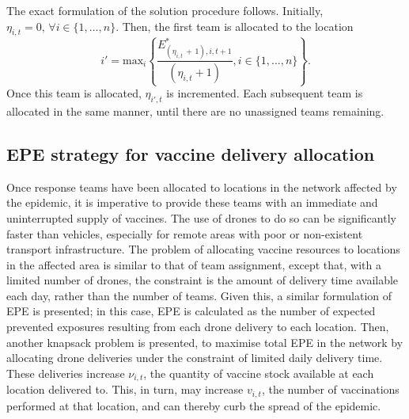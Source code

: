 \documentclass[10pt,letterpaper]{article}
\begin{document}
The exact formulation of the solution procedure follows. Initially, $\eta_{i,t} = 0, \, \forall{i} \in \{1,\dots,n \}$. 
Then, the first team is allocated to the location $$i' = \text{max}_{i} \left\{ \frac{E^{*}_{(\eta_{i,t}\,+\,1),i,t+1}}{(\eta_{i,t} + 1)}, i \in \{1, \dots, n\} \right\}.$$ 
Once this team is allocated, $\eta_{i',t}$ is incremented. Each subsequent team is allocated in the same manner, until there are no unassigned teams remaining. 

\subsection*{EPE strategy for vaccine delivery allocation}

Once response teams have been allocated to locations in the network affected by the epidemic, it is imperative to provide these teams with an immediate and uninterrupted supply of vaccines. The use of drones to do so can be significantly faster than vehicles, especially for remote areas with poor or non-existent transport infrastructure. The problem of allocating vaccine resources to locations in the affected area is similar to that of team assignment, except that, with a limited number of drones, the constraint is the amount of delivery time available each day, rather than the number of teams. Given this, a similar formulation of EPE is presented; in this case, EPE is calculated as the number of expected prevented exposures resulting from each drone delivery to each location. Then, another knapsack problem is presented, to maximise total EPE in the network by allocating drone deliveries under the constraint of limited daily delivery time. These deliveries increase $\nu_{i,t}$, the quantity of vaccine stock available at each location delivered to. This, in turn, may increase $v_{i,t}$, the number of vaccinations performed at that location, and can thereby curb the spread of the epidemic.
\end{document}
